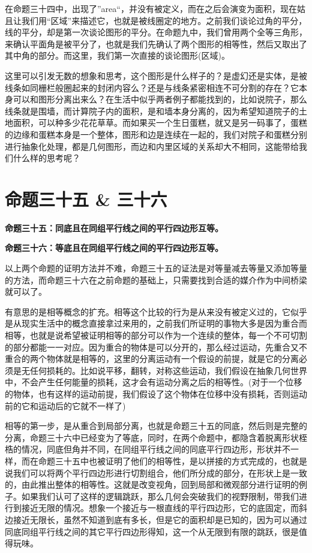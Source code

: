 \documentclass[
]{book}
\begin{document}
在命题三十四中，出现了''area``，并没有被定义，而在之后会演变为面积，现在姑且让我们用``区域''来描述它，也就是被线圈定的地方。之前我们谈论过角的平分，线的平分，却是第一次谈论图形的平分。在命题九中，我们曾用两个全等三角形，来确认平面角是被平分了，也就是我们先确认了两个图形的相等性，然后又取出了其中角的部分。而这里，我们第一次直接的谈论图形(区域)。

这里可以引发无数的想象和思考，这个图形是什么样子的？是虚幻还是实体，是被线条如同栅栏般圈起来的封闭内容么？还是与线条紧密相连不可分割的存在？它本身可以和图形分离出来么？在生活中似乎两者例子都能找到的，比如说院子，那么线条就是围墙，而计算院子内的面积，是和墙本身分离的，因为希望知道院子的土地面积，可以种多少花花草草。而如果买一个生日蛋糕，就又是另一码事了，蛋糕的边缘和蛋糕本身是一个整体，图形和边是连续在一起的，我们对院子和蛋糕分别进行抽象化处理，都是几何图形，而边和内里区域的关系却大不相同，这能带给我们什么样的思考呢？

\hypertarget{ux547dux9898ux4e09ux5341ux4e94-ux4e09ux5341ux516d}{%
\section{命题三十五 \& 三十六}\label{ux547dux9898ux4e09ux5341ux4e94-ux4e09ux5341ux516d}}

\textbf{命题三十五：同底且在同组平行线之间的平行四边形互等。}

\textbf{命题三十六：等底且在同组平行线之间的平行四边形互等。}

以上两个命题的证明方法并不难，命题三十五的证法是对等量减去等量又添加等量的方法，而命题三十六在之前命题的基础上，只需要找到合适的媒介作为中间桥梁就可以了。

有意思的是相等概念的扩充。相等这个比较的行为是从来没有被定义过的，它似乎是从现实生活中的概念直接拿过来用的，之前我们所证明的事物大多是因为重合而相等，也就是说希望被证明相等的部分可以作为一个连续的整体，每一个不可切割的部分都能一一对应。因为重合的物体是可以分开的，那么经过运动，先重合又不重合的两个物体就是相等的，这里的分离运动有一个假设的前提，就是它的分离必须是无任何损耗的。比如说平移，翻转，对称这些运动，我们假设在抽象几何世界中，不会产生任何能量的损耗，这才会有运动分离之后的相等性。(对于一个位移的物体，也有这样的运动前提，我们假设了这个物体在位移中没有损耗，否则运动前的它和运动后的它就不一样了)

相等的第一步，是从重合到局部分离，也就是命题三十五的同底，然后则是完整的分离，命题三十六中已经变为了等底，同时，在两个命题中，都隐含着脱离形状桎梏的情况，同底但角并不同，在同组平行线之间的同底平行四边形，形状并不一样，而在命题三十五中也被证明了他们的相等性，是以拼接的方式完成的，也就是说我们可以将两个平行四边形进行切割组合，他们所分成的部分，在形状上是一致的，由此推出整体的相等性。这就是改变视角，回到局部和微观部分进行证明的例子。如果我们认可了这样的逻辑跳跃，那么几何会突破我们的视野限制，带我们进行到接近无限的情况。想象一个接近与一根直线的平行四边形，它的底固定，而斜边接近无限长，虽然不知道到底有多长，但是它的面积却是已知的，因为可以通过同底同组平行线之间的其它平行四边形得知，这一个从无限到有限的跳跃，很是值得玩味。
\end{document}
